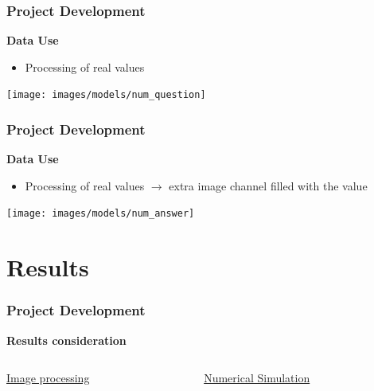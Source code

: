 \documentclass[18pt]{beamer}
\begin{document}
\begin{frame}[t]
  \frametitle{Project Development}
  \large{\textbf{Data Use}}
  \begin{itemize}
    \item Processing of real values
  \end{itemize}
  \vspace{0.5cm}
  \begin{center}
    \texttt{[image: images/models/num\_question]}
  \end{center}  
\end{frame}

\begin{frame}[t]
  \frametitle{Project Development}
  \large{\textbf{Data Use}}
  \begin{itemize}
    \item Processing of real values $\rightarrow$ extra image channel filled with the value
  \end{itemize}
  \vspace{0.5cm}
  \begin{center}
    \texttt{[image: images/models/num\_answer]}
  \end{center}  
\end{frame}

\section{Results}
\begin{frame}[t]
  \frametitle{Project Development}
  \large{\textbf{Results consideration}}
  \vspace{-0.5cm}
  \begin{columns}[t]
    \begin{column}{0.5\textwidth}
      \begin{center}
        {\large \underline{Image processing}}
      \end{center}
    \end{column}
    \begin{column}{0.5\textwidth}
      \begin{center}
        {\large \underline{Numerical Simulation}}
      \end{center}  
    \end{column}
  \end{columns}  
\end{frame}
\end{document}
